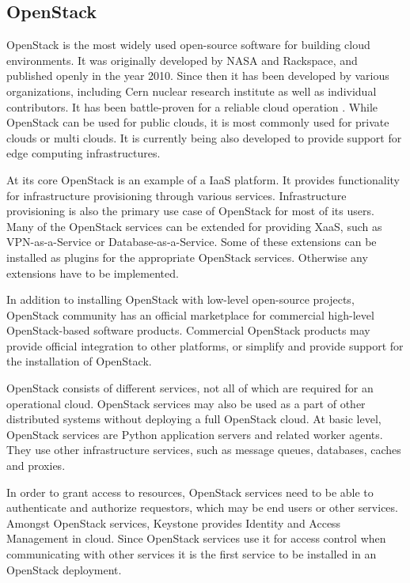 \documentclass[officiallayout]{tktla}
\begin{document}
\subsection{OpenStack}

OpenStack \cite{openstack} is the most widely used open-source software for
building cloud environments. It was originally developed by NASA and Rackspace,
and published openly in the year 2010. Since then it has been developed by
various organizations, including Cern nuclear research institute as well as
individual contributors. It has been battle-proven for a reliable cloud
operation \cite{forrester}. While OpenStack can be used for public clouds, it
is most commonly used for private clouds or multi clouds. It is currently being
also developed to provide support for edge computing infrastructures.

At its core OpenStack is an example of a IaaS platform. It provides
functionality for infrastructure provisioning through various services.
Infrastructure provisioning is also the primary use case of OpenStack for most
of its users. Many of the OpenStack services can be extended for providing
XaaS, such as VPN-as-a-Service or Database-as-a-Service. Some of these
extensions can be installed as plugins for the appropriate OpenStack services.
Otherwise any extensions have to be implemented.

In addition to installing OpenStack with low-level open-source projects,
OpenStack community has an official marketplace for commercial high-level
OpenStack-based software products. Commercial OpenStack products may provide
official integration to other platforms, or simplify and provide support for
the installation of OpenStack.

OpenStack consists of different services, not all of which are required for an
operational cloud. OpenStack services may also be used as a part of other
distributed systems without deploying a full OpenStack cloud. At basic level,
OpenStack services are Python application servers and related worker agents.
They use other infrastructure services, such as message queues, databases,
caches and proxies.

In order to grant access to resources, OpenStack services need to be able to
authenticate and authorize requestors, which may be end users or other
services. Amongst OpenStack services, Keystone provides Identity and Access
Management in cloud. Since OpenStack services use it for access control when
communicating with other services it is the first service to be installed in
an OpenStack deployment.
\end{document}

